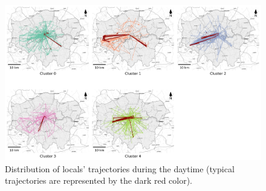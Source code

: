 \documentclass{article}
\theoremstyle{definition}
\theoremstyle{remark}
\begin{document}
\begin{figure}[!h]
\centering
\includegraphics[width=1\textwidth]{figures/traj_distribution_daytime_locals.png}
\caption{\label{fig:traj_distribution_daytime_locals}Distribution of locals' trajectories during the daytime (typical trajectories are represented by the dark red color).}
\end{figure}
\end{document}
